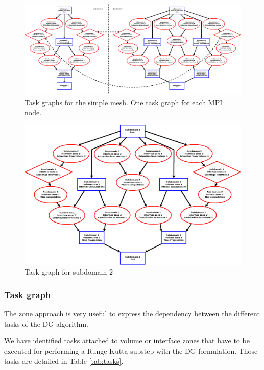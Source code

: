 \documentclass[12pt]{amsart}
\begin{document}
%
\begin{figure}
  \centering
 \includegraphics[width=17cm]{graph_exemple}
  \caption{Task graphs for the simple mesh. One task graph for each MPI node.}
  \label{fig:mpi-task-graph}
\end{figure}

\begin{figure}
  \centering
\includegraphics[width=15cm]{graph_exemple_2}
  \caption{Task graph for subdomain 2}
  \label{fig:sub2-task-graph}
\end{figure}


\subsubsection{Task graph}
The zone approach is very useful to express the dependency between the different tasks of the DG algorithm.

We have identified tasks attached to volume or interface zones that have to be executed for performing a Runge-Kutta substep with the DG formulation. Those tasks are detailed in Table \ref{tab:tasks}.
\end{document}
